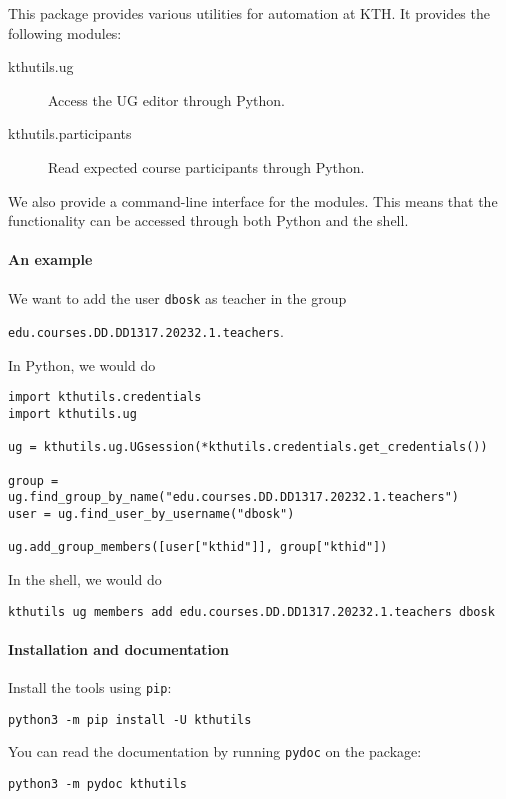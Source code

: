 This package provides various utilities for automation at KTH.
It provides the following modules:
\begin{description}
  \item[kthutils.ug] Access the UG editor through Python.
  \item[kthutils.participants] Read expected course participants through 
    Python.
\end{description}

We also provide a command-line interface for the modules.
This means that the functionality can be accessed through both Python and the 
shell.

\paragraph{An example}

We want to add the user \texttt{dbosk} as teacher in the 
group
\begin{center}
  \texttt{edu.courses.DD.DD1317.20232.1.teachers}.
\end{center}

In Python, we would do
\begin{verbatim}
import kthutils.credentials
import kthutils.ug

ug = kthutils.ug.UGsession(*kthutils.credentials.get_credentials())

group = ug.find_group_by_name("edu.courses.DD.DD1317.20232.1.teachers")
user = ug.find_user_by_username("dbosk")

ug.add_group_members([user["kthid"]], group["kthid"])
\end{verbatim}

In the shell, we would do
\begin{verbatim}
kthutils ug members add edu.courses.DD.DD1317.20232.1.teachers dbosk
\end{verbatim}

\paragraph{Installation and documentation}

Install the tools using \texttt{pip}:
\begin{verbatim}
python3 -m pip install -U kthutils
\end{verbatim}

You can read the documentation by running \texttt{pydoc} on the package:
\begin{verbatim}
python3 -m pydoc kthutils
\end{verbatim}
